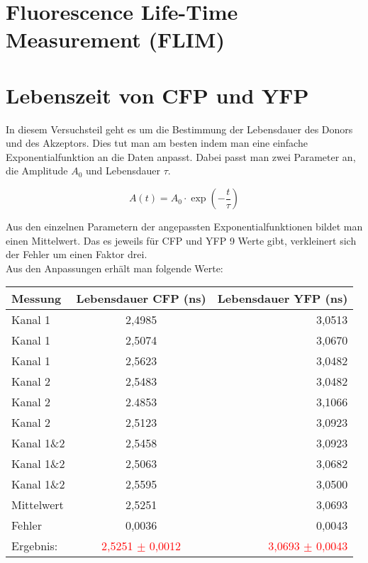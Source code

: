 \section{Fluorescence Life-Time Measurement (FLIM)}

\section{Lebenszeit von CFP und YFP}

In diesem Versuchsteil geht es um die Bestimmung der Lebensdauer des Donors und des Akzeptors. Dies tut man am 
besten indem man eine einfache Exponentialfunktion an die Daten anpasst. Dabei passt man zwei Parameter an, die Amplitude $A_0$ und 
Lebensdauer $\tau$.

\begin{equation}
    A(t) = A_0 \cdot \exp(-\frac{t}{\tau})
\end{equation}

Aus den einzelnen Parametern der angepassten Exponentialfunktionen bildet man einen Mittelwert. Das es jeweils für CFP und YFP 9 Werte gibt, 
verkleinert sich der Fehler um einen Faktor drei.\\
Aus den Anpassungen erhält man folgende Werte:\\

\begin{center}
    \centering
    \begin{tabular}{l|cr}
        \toprule
        Messung & Lebensdauer CFP (ns)& Lebensdauer YFP (ns)\\
        \midrule
        Kanal 1 & 2,4985& 3,0513\\
        Kanal 1 & 2,5074& 3,0670\\
        Kanal 1 & 2,5623& 3,0482\\
        \midrule
        Kanal 2 & 2,5483& 3,0482\\
        Kanal 2 & 2.4853& 3,1066\\
        Kanal 2 & 2,5123& 3,0923\\
        \midrule
        Kanal 1\&2 & 2,5458& 3,0923\\
        Kanal 1\&2 & 2,5063& 3,0682\\
        Kanal 1\&2 & 2,5595& 3,0500\\
        \midrule
        Mittelwert & 2,5251& 3,0693\\
        Fehler& 0,0036& 0,0043\\
        Ergebnis:& \textcolor{red}{2,5251 $\pm$ 0,0012}& \textcolor{red}{3,0693 $\pm$ 0,0043}\\
        \bottomrule
    \end{tabular}
\end{center}

